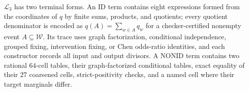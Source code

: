 \(\mathcal L_3\) has two terminal forms. An \(\mathrm{ID}\) term contains eight expressions formed from the coordinates of \(q\) by finite sums, products, and quotients; every quotient denominator is encoded as \(q(A)=\sum_{w\in A}q_w\) for a checker-certified nonempty event \(A\subseteq\mathcal W\). Its trace uses graph factorization, conditional independence, grouped fixing, intervention fixing, or Chen odds-ratio identities, and each constructor records all input and output divisors. A \(\mathrm{NONID}\) term contains two rational \(64\)-cell tables, their graph-factorized conditional tables, exact equality of their \(27\) coarsened cells, strict-positivity checks, and a named cell where their target marginals differ.